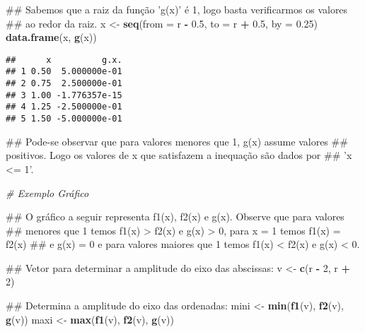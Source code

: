 \documentclass[]{book}
\newenvironment{Shaded}{\begin{snugshade}}{\end{snugshade}}
\newcommand{\KeywordTok}[1]{\textcolor[rgb]{0.13,0.29,0.53}{\textbf{#1}}}
\newcommand{\DataTypeTok}[1]{\textcolor[rgb]{0.13,0.29,0.53}{#1}}
\newcommand{\DecValTok}[1]{\textcolor[rgb]{0.00,0.00,0.81}{#1}}
\newcommand{\FloatTok}[1]{\textcolor[rgb]{0.00,0.00,0.81}{#1}}
\newcommand{\StringTok}[1]{\textcolor[rgb]{0.31,0.60,0.02}{#1}}
\newcommand{\CommentTok}[1]{\textcolor[rgb]{0.56,0.35,0.01}{\textit{#1}}}
\newcommand{\OperatorTok}[1]{\textcolor[rgb]{0.81,0.36,0.00}{\textbf{#1}}}
\newcommand{\NormalTok}[1]{#1}
\begin{document}
\begin{enumerate}
\begin{Shaded}
\begin{Highlighting}[]
\NormalTok{##  Sabemos que a raiz da função 'g(x)' é 1, logo basta verificarmos os valores}
\NormalTok{## ao redor da raiz.}
\NormalTok{x <-}\StringTok{ }\KeywordTok{seq}\NormalTok{(}\DataTypeTok{from =}\NormalTok{ r }\OperatorTok{-}\StringTok{ }\FloatTok{0.5}\NormalTok{, }\DataTypeTok{to =}\NormalTok{ r }\OperatorTok{+}\StringTok{ }\FloatTok{0.5}\NormalTok{, }\DataTypeTok{by =} \FloatTok{0.25}\NormalTok{)}
\KeywordTok{data.frame}\NormalTok{(x, }\KeywordTok{g}\NormalTok{(x))}
\end{Highlighting}
\end{Shaded}

\begin{verbatim}
##      x          g.x.
## 1 0.50  5.000000e-01
## 2 0.75  2.500000e-01
## 3 1.00 -1.776357e-15
## 4 1.25 -2.500000e-01
## 5 1.50 -5.000000e-01
\end{verbatim}

\begin{Shaded}
\begin{Highlighting}[]
\NormalTok{##  Pode-se observar que para valores menores que 1, g(x) assume valores}
\NormalTok{## positivos. Logo os valores de x que satisfazem a inequação são dados por}
\NormalTok{## 'x <= 1'.}

\CommentTok{# Exemplo Gráfico}

\NormalTok{##  O gráfico a seguir representa f1(x), f2(x) e g(x). Observe que para valores}
\NormalTok{## menores que 1 temos f1(x) > f2(x) e g(x) > 0, para x = 1 temos f1(x) = f2(x)}
\NormalTok{## e g(x) = 0 e para valores maiores que 1 temos f1(x) < f2(x) e g(x) < 0.}

\NormalTok{##  Vetor para determinar a amplitude do eixo das abscissas:}
\NormalTok{v <-}\StringTok{ }\KeywordTok{c}\NormalTok{(r }\OperatorTok{-}\StringTok{ }\DecValTok{2}\NormalTok{, r }\OperatorTok{+}\StringTok{ }\DecValTok{2}\NormalTok{)}

\NormalTok{##  Determina  a amplitude do eixo das ordenadas:}
\NormalTok{mini <-}\StringTok{ }\KeywordTok{min}\NormalTok{(}\KeywordTok{f1}\NormalTok{(v), }\KeywordTok{f2}\NormalTok{(v), }\KeywordTok{g}\NormalTok{(v))}
\NormalTok{maxi <-}\StringTok{ }\KeywordTok{max}\NormalTok{(}\KeywordTok{f1}\NormalTok{(v), }\KeywordTok{f2}\NormalTok{(v), }\KeywordTok{g}\NormalTok{(v))}


\end{Highlighting}
\end{Shaded}
\end{enumerate}
\end{document}
